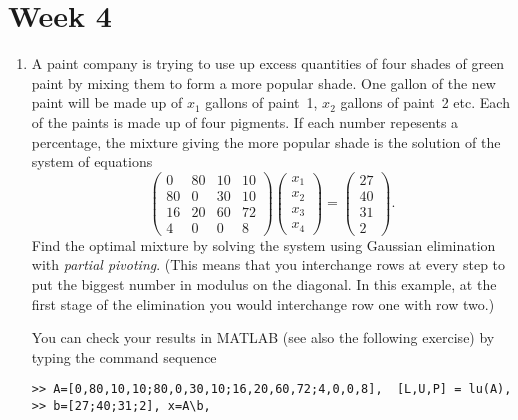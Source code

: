 \documentclass[11pt,a4paper]{article}
\begin{document}


\section*{Week 4}

\begin{enumerate}


\item\label{qdjsx3}
A paint company is trying to use up excess quantities of four shades
of green paint by mixing them to form a more popular shade. One gallon
of the new paint will be made up of $x_1$ gallons of paint~1, $x_2$
gallons of paint~2 etc. Each of the paints is made up of four
pigments. If each number repesents a percentage, 
the mixture giving the more popular shade is the solution of 
the system of equations
$$\left ( \begin{array}{rrrr}
         0 & 80 & 10 & 10 \\
        80 &  0 & 30 & 10 \\
        16 & 20 & 60 & 72 \\
         4 &  0 &  0 &  8 \end{array} \right )
   \left ( \begin{array}{c}
        x_1 \\ x_2 \\ x_3 \\ x_4 
            \end{array} \right) =
   \left ( \begin{array}{r}
        27 \\ 40 \\ 31 \\ 2 
            \end{array} \right) .$$
Find the optimal mixture by solving the system using Gaussian elimination 
with {\it partial pivoting}. (This means that you interchange rows at every step
to put the biggest number in modulus  on the diagonal. In this example,
 at the first stage of the elimination you would interchange row one with row two.)


You can check your results   in MATLAB (see also the following  exercise) by typing the command sequence
\begin{verbatim}
>> A=[0,80,10,10;80,0,30,10;16,20,60,72;4,0,0,8],  [L,U,P] = lu(A),
>> b=[27;40;31;2], x=A\b, 
\end{verbatim}


\end{enumerate}
\end{document}
